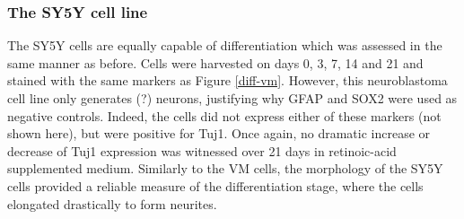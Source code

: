 \documentclass[onecolumn,10pt]{asme2ej}
\begin{document}
\subsubsection{The SY5Y cell line}
The SY5Y cells are equally capable of differentiation which was assessed in the same manner as before. Cells were harvested on days 0, 3, 7, 14 and 21 and stained with the same markers as Figure \ref{diff-vm}. However, this neuroblastoma cell line only generates (?) neurons, justifying why GFAP and SOX2 were used as negative controls. Indeed, the cells did not express either of these markers (not shown here), but were positive for Tuj1. Once again, no dramatic increase or decrease of Tuj1 expression was witnessed over 21 days in retinoic-acid supplemented medium. Similarly to the VM cells, the morphology of the SY5Y cells provided a reliable measure of the differentiation stage, where the cells elongated drastically to form neurites. 


\end{document}
